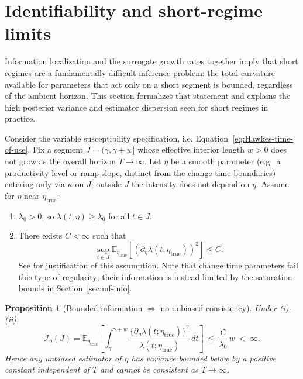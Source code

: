 \documentclass{article}
\theoremstyle{plain}
\newtheorem{proposition}[theorem]{Proposition}
\theoremstyle{definition}
\newcommand{\E}{\mathbb{E}}
\newcommand{\1}{\mathbf{1}}
\begin{document}
    
    \section{Identifiability and short-regime limits}
    \label{sec:ident}
    
    Information localization and the surrogate growth rates together imply that short regimes are a fundamentally difficult inference problem: the total curvature available for parameters that act only on a short segment is bounded, regardless of the ambient horizon. This section formalizes that statement and explains the high posterior variance and estimator dispersion seen for short regimes in practice.
    
   Consider the variable susceptibility specification, i.e. Equation~\ref{eq:Hawkes-time-of-use}. Fix a segment $J=(\gamma,\gamma+w]$ whose effective interior length $w>0$ does not grow as the overall horizon $T\to\infty$. Let $\eta$ be a smooth parameter (e.g.\ a productivity level or ramp slope, distinct from the change time boundaries) entering only via $\kappa$ on $J$; outside $J$ the intensity does not depend on $\eta$. Assume for $\eta$ near $\eta_{\mathrm{true}}$:
\begin{enumerate}
\item[(i)] $\lambda_0>0$, so $\lambda(t;\eta)\ge \lambda_0$ for all $t\in J$.
\item[(ii)] There exists $C<\infty$ such that
\[
\sup_{t\in J}\E_{\eta_{\mathrm{true}}}\!\left[(\partial_\eta \lambda(t;\eta_{\mathrm{true}}))^2\right]\le C.
\]
See \cite{clinet2017statistical} for justification of this assumption. Note that change time parameters fail this type of regularity; their information is instead limited by the saturation bounds in Section~\ref{sec:mf-info}.
\end{enumerate}

    \begin{proposition}[Bounded information $\Rightarrow$ no unbiased consistency]
\label{prop:bounded-info}
Under \emph{(i)}-\emph{(ii)},
\[
\mathcal I_\eta(J)
=\E_{\eta_{\mathrm{true}}}\left[\int_{\gamma}^{\gamma+w}\frac{\{\partial_\eta \lambda(t;\eta_{\mathrm{true}})\}^2}{\lambda(t;\eta_{\mathrm{true}})}\,dt\right]
\ \le\ \frac{C}{\lambda_0}\,w
\ <\ \infty.
\]
Hence any unbiased estimator of $\eta$ has variance bounded below by a positive constant independent of $T$ and cannot be consistent as $T\to\infty$.
\end{proposition}
\end{document}
